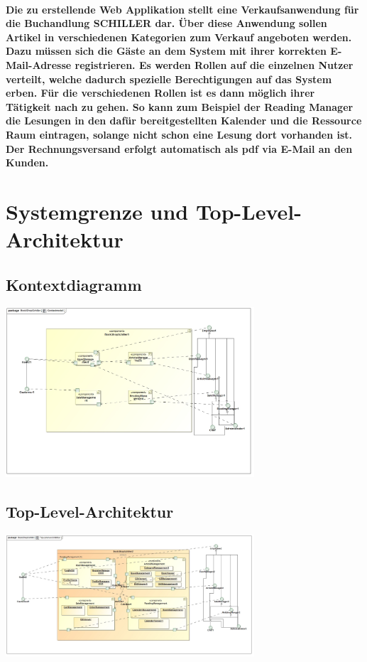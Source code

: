 \documentclass[a4paper]{article}
\begin{document}
\paragraph{Die zu erstellende Web Applikation stellt eine Verkaufsanwendung für die Buchandlung SCHILLER dar. Über diese Anwendung sollen Artikel in verschiedenen Kategorien zum Verkauf angeboten werden. Dazu müssen sich die Gäste an dem System mit ihrer korrekten E-Mail-Adresse registrieren. Es werden Rollen auf die einzelnen Nutzer verteilt, welche dadurch spezielle Berechtigungen auf das System erben. Für die verschiedenen Rollen ist es dann möglich ihrer Tätigkeit nach zu gehen. So kann zum Beispiel der Reading Manager die Lesungen in den dafür bereitgestellten Kalender und die Ressource Raum eintragen, solange nicht schon eine Lesung dort vorhanden ist. Der Rechnungsversand erfolgt automatisch als pdf via E-Mail an den Kunden.}

\section{Systemgrenze und Top-Level-Architektur}

\subsection{Kontextdiagramm}

\includegraphics[width=350px]{kontextmodell.jpg}

\subsection{Top-Level-Architektur}

\includegraphics[width=350px]{top-level-architektur.jpg}
\end{document}
